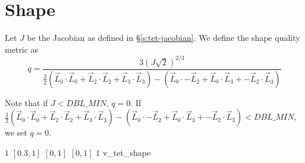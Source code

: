 \section{Shape\label{s:tet-shape}}

Let $J$ be the Jacobian as defined in \S\ref{s:tet-jacobian}.
We define the shape quality metric as
\begin{equation*}
q =  \frac{ 3 \left( J \sqrt{2} \right)^{2/3} } 
              { \frac {3}{2} \left( 
                      \vec L_0 \cdot  \vec L_0 +
                      \vec L_2 \cdot  \vec L_2 +
                      \vec L_3 \cdot  \vec L_3  \right) - 
               \left( \vec L_0 \cdot -\vec L_2 +
                      \vec L_0 \cdot  \vec L_3 +
                     -\vec L_2 \cdot  \vec L_3 \right) } 
\end{equation*}

Note that if $J < DBL\_MIN$, $q = 0$.
If $\frac {3}{2} \left( \vec L_0 \cdot \vec L_0 +
                      \vec L_2 \cdot \vec L_2 +
                      \vec L_3 \cdot \vec L_3  \right) - 
                 \left( \vec L_0 \cdot -\vec L_2 +
                      \vec L_0 \cdot \vec L_3 +
                      -\vec L_2 \cdot \vec L_3 \right) < DBL\_MIN$, we set $q = 0$.

%
{$1$}%
{$[0.3,1]$}%
{$[0,1]$}%
{$[0,1]$}%
{1}%
{\cite{knu:03}}%
{v\_tet\_shape}%


